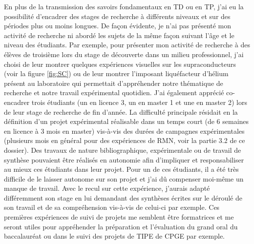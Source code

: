 En plus de la transmission des savoirs fondamentaux en TD ou en TP, j'ai eu la possibilité d'encadrer des stages de recherche à différents niveaux et sur des périodes plus ou moins longues. De façon évidente, je n'ai pas présenté mon activité de recherche ni abordé les sujets de la même façon suivant l'âge et le niveau des étudiants. Par exemple, pour présenter mon activité de recherche à des élèves de troisième lors du stage de découverte dans un milieu professionnel, j'ai choisi de leur montrer quelques expériences visuelles sur les supraconducteurs (voir la figure \ref{fig:SC}) ou de leur montrer l'imposant liquéfacteur d'hélium présent au laboratoire qui permettait d'appréhender notre thématique de recherche et notre travail expérimental quotidien. J'ai également apprécié co-encadrer trois étudiants (un en licence 3, un en master 1 et une en master 2) lors de leur stage de recherche de fin d'année. La difficulté principale résidait en la définition d'un projet expérimental réalisable dans un temps court (de 6 semaines en licence à 3 mois en master) vis-à-vis des durées de campagnes expérimentales (plusieurs mois en général pour des expériences de RMN, voir la partie 3.2 de ce dossier). %
Des travaux de nature bibliographique, expérimentale ou de travail de synthèse pouvaient être réalisés en autonomie afin d'impliquer et responsabiliser au mieux ces étudiants dans leur projet. Pour un de ces étudiants, il a été très difficile de le laisser autonome sur son projet et j'ai dû compenser moi-même un manque de travail. Avec le recul sur cette expérience, j'aurais adapté différemment son stage en lui demandant des synthèses écrites sur le déroulé de son travail et de sa compréhension vis-à-vis de celui-ci par exemple. Ces premières expériences de suivi de projets me semblent être formatrices et me seront utiles pour appréhender la préparation et l'évaluation du grand oral du baccalauréat ou dans le suivi des projets de TIPE de CPGE par exemple.

